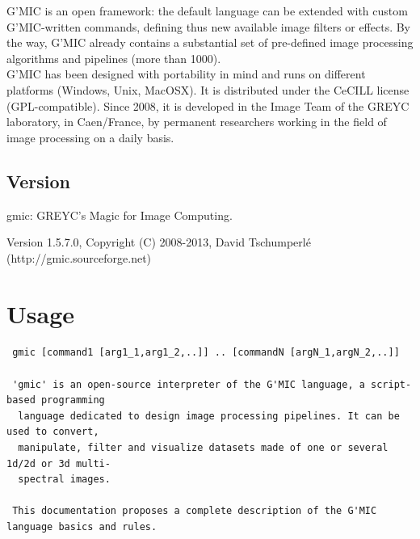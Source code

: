 \documentclass[a4paper,11pt,twoside]{book}
\begin{document}
G'MIC is an open framework: the default language can be extended with custom G'MIC-written commands, defining thus new available image filters or effects. By the way, G'MIC already contains a substantial set of pre-defined image processing algorithms and pipelines (more than 1000).\\ 
 
G'MIC has been designed with portability in mind and runs on different platforms (Windows, Unix, MacOSX). It is distributed under the CeCILL license (GPL-compatible). Since 2008, it is developed in the Image Team of the GREYC laboratory, in Caen/France, by permanent researchers working in the field of image processing on a daily basis. 
\section*{Version} 
 
 gmic: GREYC's Magic for Image Computing. 
 
        Version 1.5.7.0, Copyright (C) 2008-2013, David Tschumperl\'e 
        (http://gmic.sourceforge.net) 
\chapter{Usage} 
\small
\begin{lstlisting}
 gmic [command1 [arg1_1,arg1_2,..]] .. [commandN [argN_1,argN_2,..]] 
 
 'gmic' is an open-source interpreter of the G'MIC language, a script-based programming 
  language dedicated to design image processing pipelines. It can be used to convert, 
  manipulate, filter and visualize datasets made of one or several 1d/2d or 3d multi- 
  spectral images. 
 
 This documentation proposes a complete description of the G'MIC language basics and rules.
\end{lstlisting}
\normalsize
\end{document}
